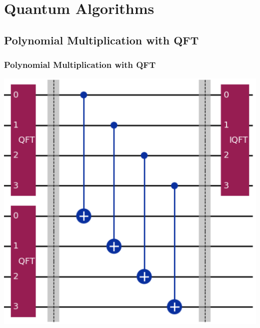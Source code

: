 \documentclass[
	11pt, %
]{beamer}
\begin{document}
\section{Quantum Algorithms}
\subsection{Polynomial Multiplication with QFT}
\begin{frame}
    \frametitle{Polynomial Multiplication with QFT}
    \begin{center}
        \includegraphics[scale=0.7]{basic_circuit.PNG}
    \end{center}
\end{frame}

\end{document}

